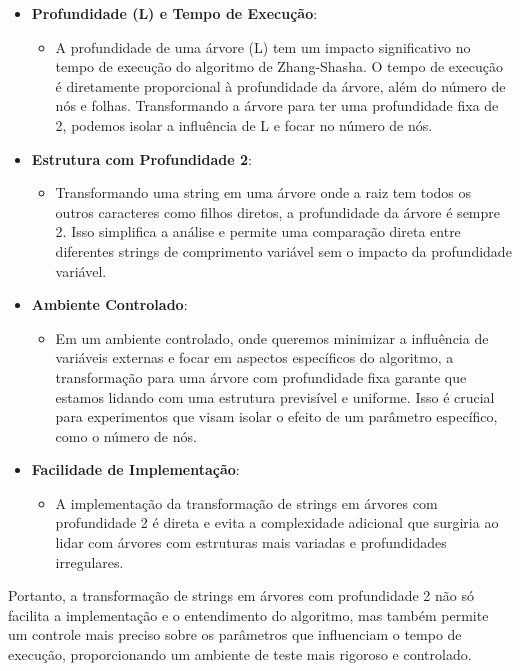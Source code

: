 \documentclass[12pt]{article}
\begin{document}
\begin{itemize}
    \item \textbf{Profundidade (L) e Tempo de Execução}:
    \begin{itemize}
        \item A profundidade de uma árvore (L) tem um impacto significativo no tempo de execução do algoritmo de Zhang-Shasha. O tempo de execução é diretamente proporcional à profundidade da árvore, além do número de nós e folhas. Transformando a árvore para ter uma profundidade fixa de 2, podemos isolar a influência de L e focar no número de nós.
    \end{itemize}
    
    \item \textbf{Estrutura com Profundidade 2}:
    \begin{itemize}
        \item Transformando uma string em uma árvore onde a raiz tem todos os outros caracteres como filhos diretos, a profundidade da árvore é sempre 2. Isso simplifica a análise e permite uma comparação direta entre diferentes strings de comprimento variável sem o impacto da profundidade variável.
    \end{itemize}
    
    \item \textbf{Ambiente Controlado}:
    \begin{itemize}
        \item Em um ambiente controlado, onde queremos minimizar a influência de variáveis externas e focar em aspectos específicos do algoritmo, a transformação para uma árvore com profundidade fixa garante que estamos lidando com uma estrutura previsível e uniforme. Isso é crucial para experimentos que visam isolar o efeito de um parâmetro específico, como o número de nós.
    \end{itemize}
    
    \item \textbf{Facilidade de Implementação}:
    \begin{itemize}
        \item A implementação da transformação de strings em árvores com profundidade 2 é direta e evita a complexidade adicional que surgiria ao lidar com árvores com estruturas mais variadas e profundidades irregulares.
    \end{itemize}
\end{itemize}

Portanto, a transformação de strings em árvores com profundidade 2 não só facilita a implementação e o entendimento do algoritmo, mas também permite um controle mais preciso sobre os parâmetros que influenciam o tempo de execução, proporcionando um ambiente de teste mais rigoroso e controlado.
\newpage
\end{document}
